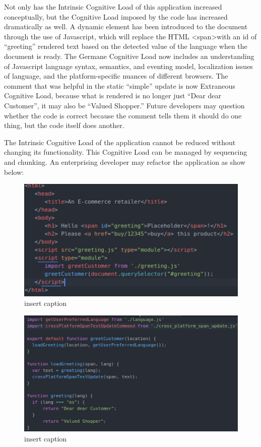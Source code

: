 Not only has the Intrinsic Cognitive Load of this application increased conceptually, but the Cognitive Load imposed by the code has increased dramatically as well. A dynamic element has been introduced to the document through the use of Javascript, which will replace the HTML \textless span\textgreater with an id of “greeting” rendered text based on the detected value of the language when the document is ready. The Germane Cognitive Load now includes an understanding of Javascript language syntax, semantics, and eventing model, localization issues of language, and the platform-specific nuances of different browsers. The comment that was helpful in the static “simple” update is now Extraneous Cognitive Load, because what is rendered is no longer just “Dear dear Customer”, it may also be “Valued Shopper.” Future developers may question whether the code is correct because the comment tells them it should do one thing, but the code itself does another.

The Intrinsic Cognitive Load of the application cannot be reduced without changing its functionality. This Cognitive Load can be managed by sequencing and chunking. An enterprising developer may refactor the application as show below:

\begin{figure}[H]
	\centering
	\includegraphics[scale=.7]{code4}
	\caption{insert caption}
\end{figure}

\begin{figure}[H]
	\centering
	\includegraphics[scale=.7]{code5}
	\caption{insert caption}
\end{figure}

